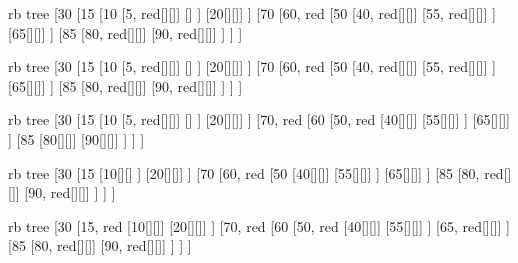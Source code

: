 

\begin{page}
	\begin{forest} rb tree
		[30
			[15
				[10
					[5, red[][]]
					[]
				]
				[20[][]]
			]
			[70
				[60, red
					[50
						[40, red[][]]
						[55, red[][]]
					]
					[65[][]]
				]
				[85
					[80, red[][]]
					[90, red[][]]
				]
			]
		]
	\end{forest}
\end{page}

\begin{page}
	\begin{forest} rb tree
		[30
			[15
				[10
					[5, red[][]]
					[]
				]
				[20[][]]
			]
			[70
				[60, red
					[50
						[40, red[][]]
						[55, red[][]]
					]
					[65[][]]
				]
				[85
					[80, red[][]]
					[90, red[][]]
				]
			]
		]
	\end{forest}
\end{page}

\begin{page}
	\begin{forest} rb tree
		[30
			[15
				[10
					[5, red[][]]
					[]
				]
				[20[][]]
			]
			[70, red
				[60
					[50, red
						[40[][]]
						[55[][]]
					]
					[65[][]]
				]
				[85
					[80[][]]
					[90[][]]
				]
			]
		]
	\end{forest}
\end{page}

\begin{page}
	\begin{forest} rb tree
		[30
			[15
				[10[][]
				]
				[20[][]]
			]
			[70
				[60, red
					[50
						[40[][]]
						[55[][]]
					]
					[65[][]]
				]
				[85
					[80, red[][]]
					[90, red[][]]
				]
			]
		]
	\end{forest}
\end{page}

\begin{page}
	\begin{forest} rb tree
		[30
			[15, red
				[10[][]]
				[20[][]]
			]
			[70, red
				[60
					[50, red
						[40[][]]
						[55[][]]
					]
					[65, red[][]]
				]
				[85
					[80, red[][]]
					[90, red[][]]
				]
			]
		]
	\end{forest}
\end{page}

